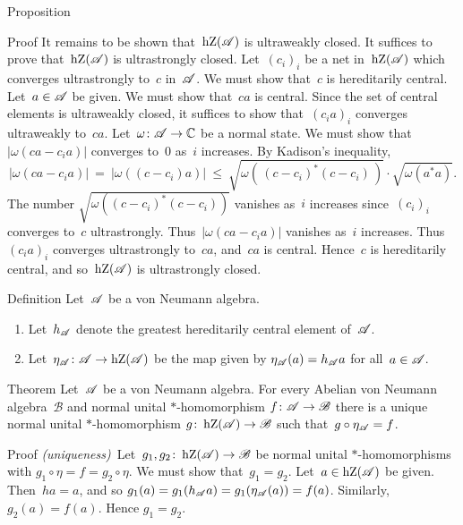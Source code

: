 \documentclass[a]{subfiles}
\begin{document}
\begin{parsec}
\begin{point}{Proposition}
\begin{point}{Proof}
It remains to be shown that~$\operatorname{hZ}(\mathscr{A})$ is ultraweakly closed.
It suffices to prove that~$\operatorname{hZ}(\mathscr{A})$
is ultrastrongly closed.
Let~$(c_i)_i$ be a net in~$\operatorname{hZ}(\mathscr{A})$
which converges ultrastrongly to~$c$ in~$\mathscr{A}$.
We must show that~$c$ is hereditarily central.
Let~$a\in \mathscr{A}$ be given.
We must show that~$ca$ is central.
Since the set of central elements is ultraweakly closed,
it suffices to show that~$(c_ia)_i$ converges ultraweakly to~$ca$.
Let~$\omega\colon\mathscr{A}\to\mathbb{C}$
be a normal state.
We must show that $|\omega(ca-c_ia)|$
converges to~$0$ as~$i$ increases.
By Kadison's inequality,
\begin{equation*}
|\omega(ca -c_ia)| \ =\  |\omega((c-c_i)a)|
\ \leq\  \sqrt{\omega(\,(c-c_i)^*(c-c_i)\,)}\cdot\sqrt{\omega(a^*a)}.
\end{equation*}
The number $\sqrt{\omega((c-c_i)^*(c-c_i))}$ 
vanishes as~$i$ increases
since~$(c_i)_i$ converges to~$c$ ultrastrongly.
Thus~$|\omega(ca-c_ia)|$ vanishes as~$i$ increases.
Thus~$(c_ia)_i$ converges ultrastrongly to~$ca$,
and~$ca$ is central.
Hence~$c$ is hereditarily central,
and so~$\operatorname{hZ}(\mathscr{A})$
is ultrastrongly closed.
\end{point}
\end{point}
\begin{point}{Definition}%
Let~$\mathscr{A}$ be a von Neumann algebra.
\begin{enumerate}
\item
Let~$h_{\mathscr{A}}$ denote the greatest hereditarily central
element of~$\mathscr{A}$.

\item
Let~$\eta_{\mathscr{A}}\colon \mathscr{A}\to \operatorname{hZ}(\mathscr{A})$
be the map given by $\eta_{\mathscr{A}}(a)=h_{\mathscr{A}} a$
for all~$a\in\mathscr{A}$.
\end{enumerate}
\end{point}
\begin{point}{Theorem}%
Let~$\mathscr{A}$
be a von Neumann algebra.
For every Abelian von Neumann algebra~$\mathscr{B}$
and normal unital $*$-homomorphism $f\colon\mathscr{A}\to\mathscr{B}$
there is a unique normal unital $*$-homomorphism 
$g\colon\operatorname{hZ}(\mathscr{A})\to \mathscr{B}$
such that~$g\circ \eta_{\mathscr{A}} = f$.
\begin{point}{Proof}%
\emph{(uniqueness)}\ 
Let~$g_1,g_2\colon \operatorname{hZ}(\mathscr{A})\to\mathscr{B}$
be normal unital $*$-homomorphisms
with $g_1\circ \eta = f = g_2 \circ \eta$.
We must show that~$g_1 = g_2$.
Let~$a\in \operatorname{hZ}(\mathscr{A})$
be given.
Then~$ha=a$, and so $g_1(a) = g_1(h_{\mathscr{A}} a) 
= g_1(\eta_{\mathscr{A}}(a)) = f(a)$.
Similarly, $g_2(a)=f(a)$. Hence $g_1=g_2$.


\end{point}
\end{point}
\end{parsec}
\end{document}
